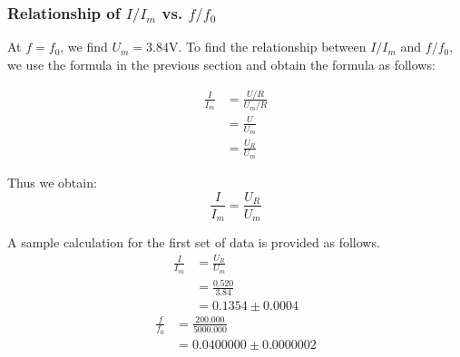 \documentclass[a4paper]{article}
\begin{document}
\subsubsection{Relationship of $I/I_m$ vs. $f/f_0$}

At $f=f_0$, we find $U_m=3.84$V. To find the relationship between $I/I_m$ and $f/f_0$, we use the formula in the previous section and obtain the formula as follows:

\begin{align*}
	\frac{I}{I_m}
	 & = \frac{U/R}{U_m/R} \\
	 & = \frac{U}{U_m}     \\
	 & = \frac{U_R}{U_m}
\end{align*}

Thus we obtain:
\begin{equation}
	\frac{I}{I_m} = \frac{U_R}{U_m}
\end{equation}

A sample calculation for the first set of data is provided as follows.
\begin{align*}
	\frac{I}{I_m}
	 & = \frac{U_R}{U_m}    \\
	 & = \frac{0.520}{3.84} \\
	 & = 0.1354\pm 0.0004
\end{align*}
\begin{align*}
	\frac{f}{f_0}
	 & = \frac{200.000}{5000.000} \\
	 & = 0.0400000\pm 0.0000002
\end{align*}
\end{document}
